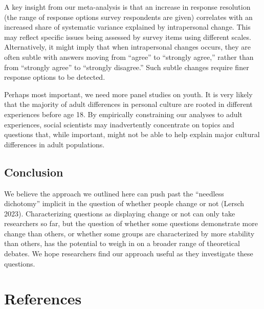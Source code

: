 \documentclass[
  12pt,
]{article}
\begin{document}
A key insight from our meta-analysis is that an increase in response
resolution (the range of response options survey respondents are given)
correlates with an increased share of systematic variance explained by
intrapersonal change. This may reflect specific issues being assessed by
survey items using different scales. Alternatively, it might imply that
when intrapersonal changes occurs, they are often subtle with answers
moving from ``agree'' to ``strongly agree,'' rather than from ``strongly
agree'' to ``strongly disagree.'' Such subtle changes require finer
response options to be detected.

Perhaps most important, we need more panel studies on youth. It is very
likely that the majority of adult differences in personal culture are
rooted in different experiences before age 18. By empirically
constraining our analyses to adult experiences, social scientists may
inadvertently concentrate on topics and questions that, while important,
might not be able to help explain major cultural differences in adult
populations.

\hypertarget{conclusion}{%
\subsection{Conclusion}\label{conclusion}}

We believe the approach we outlined here can push past the ``needless
dichotomy'' implicit in the question of whether people change or not
(Lersch 2023). Characterizing questions as displaying change or not can
only take researchers so far, but the question of whether some questions
demonstrate more change than others, or whether some groups are
characterized by more stability than others, has the potential to weigh
in on a broader range of theoretical debates. We hope researchers find
our approach useful as they investigate these questions.

\theendnotes

\hypertarget{references}{%
\section{References}\label{references}}
\end{document}
